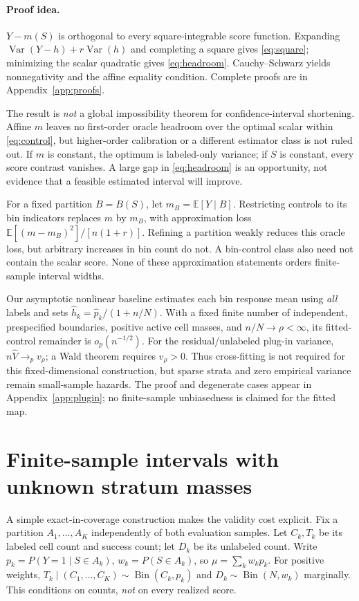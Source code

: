 \documentclass{article}
\newcommand{\E}{\mathbb E}
\newcommand{\Var}{\operatorname{Var}}
\begin{document}
\paragraph{Proof idea.}
$Y-m(S)$ is orthogonal to every square-integrable score function. Expanding $\Var(Y-h)+r\Var(h)$ and completing a square gives \eqref{eq:square}; minimizing the scalar quadratic gives \eqref{eq:headroom}. Cauchy--Schwarz yields nonnegativity and the affine equality condition. Complete proofs are in Appendix~\ref{app:proofs}.

The result is \emph{not} a global impossibility theorem for confidence-interval shortening. Affine $m$ leaves no first-order oracle headroom over the optimal scalar within \eqref{eq:control}, but higher-order calibration or a different estimator class is not ruled out. If $m$ is constant, the optimum is labeled-only variance; if $S$ is constant, every score contrast vanishes. A large gap in \eqref{eq:headroom} is an opportunity, not evidence that a feasible estimated interval will improve.

For a fixed partition $B=B(S)$, let $m_B=\E[Y\mid B]$. Restricting controls to its bin indicators replaces $m$ by $m_B$, with approximation loss $\E[(m-m_B)^2]/[n(1+r)]$. Refining a partition weakly reduces this oracle loss, but arbitrary increases in bin count do not. A bin-control class also need not contain the scalar score. None of these approximation statements orders finite-sample interval widths.

Our asymptotic nonlinear baseline estimates each bin response mean using \emph{all} labels and sets $\widehat h_k=\widehat p_k/(1+n/N)$. With a fixed finite number of independent, prespecified boundaries, positive active cell masses, and $n/N\to\rho<\infty$, its fitted-control remainder is $o_p(n^{-1/2})$. For the residual/unlabeled plug-in variance, $n\widehat V\to_p v_\rho$; a Wald theorem requires $v_\rho>0$. Thus cross-fitting is not required for this fixed-dimensional construction, but sparse strata and zero empirical variance remain small-sample hazards. The proof and degenerate cases appear in Appendix~\ref{app:plugin}; no finite-sample unbiasedness is claimed for the fitted map.

\section{Finite-sample intervals with unknown stratum masses}\label{sec:exact}
A simple exact-in-coverage construction makes the validity cost explicit. Fix a partition $A_1,\ldots,A_K$ independently of both evaluation samples. Let $C_k,T_k$ be its labeled cell count and success count; let $D_k$ be its unlabeled count. Write $p_k=P(Y=1\mid S\in A_k)$, $w_k=P(S\in A_k)$, so $\mu=\sum_k w_kp_k$. For positive weights, $T_k\mid(C_1,\ldots,C_K)\sim\operatorname{Bin}(C_k,p_k)$ and $D_k\sim\operatorname{Bin}(N,w_k)$ marginally. This conditions on counts, \emph{not} on every realized score.
\end{document}
